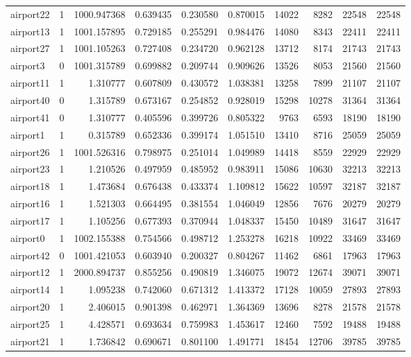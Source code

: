\begin{longtable}{|l|r|r|r|r|r|r|r|r|r|}
airport22 & 1 & 1000.947368 & 0.639435 & 0.230580 & 0.870015 & 14022 & 8282 & 22548 & 22548 \\
airport13 & 1 & 1001.157895 & 0.729185 & 0.255291 & 0.984476 & 14080 & 8343 & 22411 & 22411 \\
airport27 & 1 & 1001.105263 & 0.727408 & 0.234720 & 0.962128 & 13712 & 8174 & 21743 & 21743 \\
airport3 & 0 & 1001.315789 & 0.699882 & 0.209744 & 0.909626 & 13526 & 8053 & 21560 & 21560 \\
airport11 & 1 & 1.310777 & 0.607809 & 0.430572 & 1.038381 & 13258 & 7899 & 21107 & 21107 \\
airport40 & 0 & 1.315789 & 0.673167 & 0.254852 & 0.928019 & 15298 & 10278 & 31364 & 31364 \\
airport41 & 0 & 1.310777 & 0.405596 & 0.399726 & 0.805322 & 9763 & 6593 & 18190 & 18190 \\
airport1 & 1 & 0.315789 & 0.652336 & 0.399174 & 1.051510 & 13410 & 8716 & 25059 & 25059 \\
airport26 & 1 & 1001.526316 & 0.798975 & 0.251014 & 1.049989 & 14418 & 8559 & 22929 & 22929 \\
airport23 & 1 & 1.210526 & 0.497959 & 0.485952 & 0.983911 & 15086 & 10630 & 32213 & 32213 \\
airport18 & 1 & 1.473684 & 0.676438 & 0.433374 & 1.109812 & 15622 & 10597 & 32187 & 32187 \\
airport16 & 1 & 1.521303 & 0.664495 & 0.381554 & 1.046049 & 12856 & 7676 & 20279 & 20279 \\
airport17 & 1 & 1.105256 & 0.677393 & 0.370944 & 1.048337 & 15450 & 10489 & 31647 & 31647 \\
airport0 & 1 & 1002.155388 & 0.754566 & 0.498712 & 1.253278 & 16218 & 10922 & 33469 & 33469 \\
airport42 & 0 & 1001.421053 & 0.603940 & 0.200327 & 0.804267 & 11462 & 6861 & 17963 & 17963 \\
airport12 & 1 & 2000.894737 & 0.855256 & 0.490819 & 1.346075 & 19072 & 12674 & 39071 & 39071 \\
airport14 & 1 & 1.095238 & 0.742060 & 0.671312 & 1.413372 & 17128 & 10059 & 27893 & 27893 \\
airport20 & 1 & 2.406015 & 0.901398 & 0.462971 & 1.364369 & 13696 & 8278 & 21578 & 21578 \\
airport25 & 1 & 4.428571 & 0.693634 & 0.759983 & 1.453617 & 12460 & 7592 & 19488 & 19488 \\
airport21 & 1 & 1.736842 & 0.690671 & 0.801100 & 1.491771 & 18454 & 12706 & 39785 & 39785 \\

\end{longtable}
